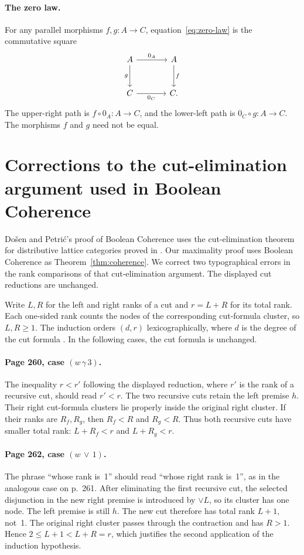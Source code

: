 \documentclass[11pt]{article}
\begin{document}
\paragraph{The zero law.}
For any parallel morphisms $f,g:A\to C$,
equation~\eqref{eq:zero-law} is the commutative square
\[
\begin{tikzcd}[column sep=large,row sep=large]
 A\arrow[r,"0_A"]\arrow[d,"g"']&A\arrow[d,"f"]\\
 C\arrow[r,"0_C"']&C.
\end{tikzcd}
\]
The upper-right path is $f\circ0_A:A\to C$, and the lower-left
path is $0_C\circ g:A\to C$. The morphisms $f$ and $g$ need not be equal.

\section{Corrections to the cut-elimination argument used in Boolean Coherence}
\label{app:cut-errata}

Do\v{s}en and Petri\'c's proof of Boolean Coherence
\cite[\S14.2]{DP} uses the cut-elimination theorem for distributive
lattice categories proved in \cite[\S11.2]{DP}.
Our maximality proof uses Boolean Coherence as
Theorem~\ref{thm:coherence}.
We correct two typographical errors in the rank comparisons of
that cut-elimination argument. The displayed cut reductions are unchanged.

Write $L,R$ for the left and right ranks of a cut and $r=L+R$
for its total rank. Each one-sided rank counts the nodes of the
corresponding cut-formula cluster, so $L,R\geq1$.
The induction orders $(d,r)$ lexicographically, where $d$ is the
degree of the cut formula \cite[pp.~249,253]{DP}.
In the following cases, the cut formula is unchanged.

\paragraph{Page 260, case $(w\,\gamma\,3)$.}
The inequality $r<r'$ following the displayed reduction, where $r'$
is the rank of a recursive cut, should read $r'<r$.
The two recursive cuts retain the left premise $h$.
Their right cut-formula clusters lie properly inside the original
right cluster. If their ranks are $R_f,R_g$, then
$R_f<R$ and $R_g<R$. Thus both recursive cuts have smaller total
rank: $L+R_f<r$ and $L+R_g<r$.

\paragraph{Page 262, case $(w\,\vee\,1)$.}
The phrase ``whose rank is~1'' should read ``whose right rank
is~1'', as in the analogous case on p.~261.
After eliminating the first recursive cut, the selected disjunction
in the new right premise is introduced by $\vee L$, so its
cluster has one node. The left premise is still $h$.
The new cut therefore has total rank $L+1$, not~1.
The original right cluster passes through the contraction and has
$R>1$. Hence $2\leq L+1<L+R=r$, which justifies the second
application of the induction hypothesis.
\end{document}

